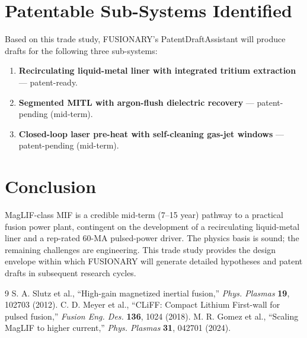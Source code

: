 \documentclass[11pt]{article}
\begin{document}
\section{Patentable Sub-Systems Identified}

Based on this trade study, FUSIONARY's PatentDraftAssistant will produce
drafts for the following three sub-systems:

\begin{enumerate}
\item \textbf{Recirculating liquid-metal liner with integrated tritium
extraction} --- patent-ready.
\item \textbf{Segmented MITL with argon-flush dielectric recovery} ---
patent-pending (mid-term).
\item \textbf{Closed-loop laser pre-heat with self-cleaning gas-jet
windows} --- patent-pending (mid-term).
\end{enumerate}

\section{Conclusion}

MagLIF-class MIF is a credible mid-term (7--15 year) pathway to a
practical fusion power plant, contingent on the development of a
recirculating liquid-metal liner and a rep-rated 60-MA pulsed-power
driver. The physics basis is sound; the remaining challenges are
engineering. This trade study provides the design envelope within
which FUSIONARY will generate detailed hypotheses and patent drafts
in subsequent research cycles.

\begin{thebibliography}{9}
 S. A. Slutz et al., ``High-gain magnetized inertial
fusion,'' \textit{Phys. Plasmas} \textbf{19}, 102703 (2012).
 C. D. Meyer et al., ``CLiFF: Compact Lithium First-wall
for pulsed fusion,'' \textit{Fusion Eng. Des.} \textbf{136}, 1024 (2018).
 M. R. Gomez et al., ``Scaling MagLIF to higher
current,'' \textit{Phys. Plasmas} \textbf{31}, 042701 (2024).
\end{thebibliography}
\end{document}
